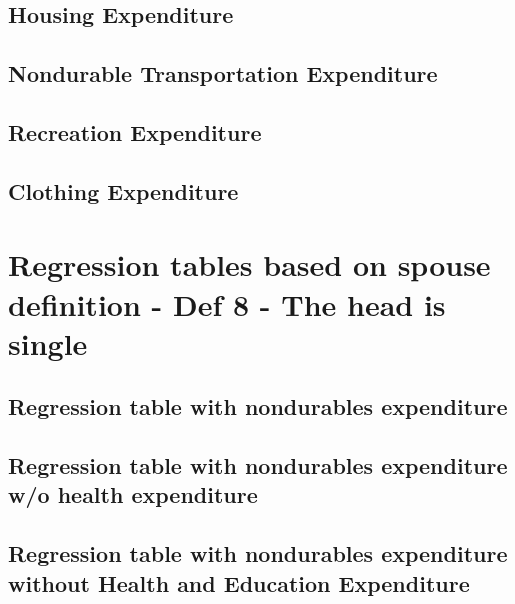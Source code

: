 \documentclass[a4paper,landscape]{article}
\begin{document}
\subsection{Housing Expenditure}

\clearpage

\subsection{Nondurable Transportation Expenditure}

\clearpage

\subsection{Recreation Expenditure}

\clearpage

\subsection{Clothing Expenditure}

\clearpage



\section{Regression tables based on spouse definition - Def 8 - The head is single}

\subsection{Regression table with nondurables expenditure}

\clearpage

\subsection{Regression table with nondurables expenditure w/o health expenditure} 

\clearpage

\subsection{Regression table with nondurables expenditure without Health and Education Expenditure}

\clearpage
\end{document}
